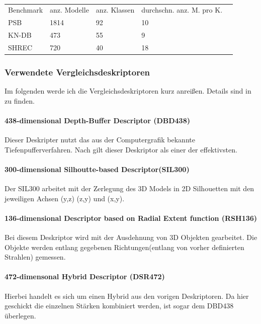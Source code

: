 \begin{table}[H]
	\centering
	\caption{}
	\label{Benchmarks}
	\begin{tabular}{lllll}
		Benchmark & anz. Modelle & anz. Klassen & durchschn. anz. M. pro K. &  \\
		PSB       & 1814         & 92           & 10                                 &  \\
		KN-DB     & 473          & 55           & 9                                  &  \\
		SHREC     & 720          & 40          & 18                                & 
	\end{tabular}
\end{table}
\subsubsection{Verwendete Vergleichsdeskriptoren}
Im folgenden werde ich die Vergleichsdeskriptoren kurz anreißen. Details sind in \cite{dvvra3DModelret} zu finden.

\paragraph{438-dimensional Depth-Buffer Descriptor (DBD438)}
Dieser Deskripter nutzt das aus der Computergrafik bekannte Tiefenpufferverfahren. Nach \cite{scherer2010histograms} gilt dieser Deskriptor als einer der effektivsten.

\paragraph{300-dimensional Silhoutte-based Descriptor(SIL300)}
Der SIL300 arbeitet mit der Zerlegung des 3D Models in 2D Silhouetten 
mit den jeweiligen Achsen (y,z) (z,y) und (x,y).

\paragraph{136-dimensional Descriptor based on Radial Extent function (RSH136) }
Bei diesem Deskriptor wird mit der Ausdehnung von 3D Objekten gearbeitet. Die Objekte werden entlang gegebenen Richtungen(entlang von vorher definierten Strahlen) gemessen.

\paragraph{472-dimensonal Hybrid Descriptor (DSR472) }
Hierbei handelt es sich um einen Hybrid aus den vorigen Deskriptoren. Da hier geschickt die einzelnen Stärken kombiniert werden, ist sogar dem DBD438 überlegen.

